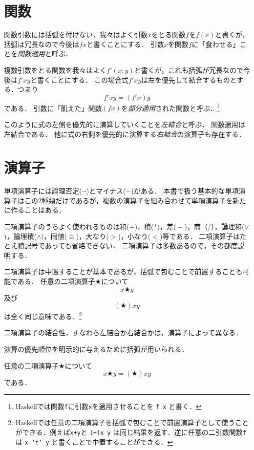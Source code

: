 \documentclass[twocolumn]{jsbook}
\newcommand{\keyword}[1]{\emph{#1}}
\newcommand{\code}[1]{\texttt{#1}}
\newenvironment{point}{\begin{screen}}{\end{screen}}
\newcommand{\binaryeq}{\equiv}
\newcommand{\binaryl}{<}
\newcommand{\binaryg}{>}
\newcommand{\binaryadd}{+}
\newcommand{\binarysub}{-}
\newcommand{\binarymultiply}{*}
\newcommand{\binarydivide}{/}
\newcommand{\binaryor}{\vee}
\newcommand{\binaryand}{\wedge}
\newcommand{\mathbinaryop}{\bigstar}
\begin{document}
\section{関数}

関数引数には括弧を付けない．我々はよく引数$x$をとる関数$f$を$f(x)$と書くが，括弧は冗長なので今後は$fx$と書くことにする．
引数$x$を関数$f$に「食わせる」ことを\keyword{関数適用}と呼ぶ．

複数引数をとる関数を我々はよく$f'(x,y)$と書くが，これも括弧が冗長なので今後は$f'xy$と書くことにする．
この場合式$f'xy$は左を優先して結合するものとする．つまり$$f'xy=(f'x)y$$である．
引数に「飢えた」関数$(fx)$を\keyword{部分適用}された関数と呼ぶ．\footnote{Haskellでは関数\code{f}に引数\code{x}を適用させることを \code{f x} と書く．}

このように式の左側を優先的に演算していくことを\keyword{左結合}と呼ぶ．
関数適用は左結合である．
他に式の右側を優先的に演算する\keyword{右結合}の演算子も存在する．

\section{演算子}

単項演算子には論理否定($\neg$)とマイナス($-$)がある．
本書で扱う基本的な単項演算子はこの2種類だけであるが，複数の演算子を組み合わせて単項演算子を新たに作ることはある．

二項演算子のうちよく使われるものは和($\binaryadd$)，積($\binarymultiply$)，差(${}\binarysub{}$)，商（${}\binarydivide{}$），論理和($\binaryor$)，論理積($\binaryand$)，同値($\binaryeq$)，大なり($\binaryg$)，小なり($\binaryl$)等である．
二項演算子はたとえ積記号であっても省略できない．
二項演算子は多数あるので，その都度説明する．

二項演算子は中置することが基本であるが，括弧で包むことで前置することも可能である．
任意の二項演算子$\mathbinaryop$について$$x\mathbinaryop y$$及び$$(\mathbinaryop)xy$$は全く同じ意味である．\footnote{Haskellでは任意の二項演算子を括弧で包むことで前置演算子として使うことができる．例えば\code{x+y}と \code{(+)x y} は同じ結果を返す．逆に任意の二引数関数\code{f}は \code{x `f` y} と書くことで中置することができる．}

二項演算子の結合性，すなわち左結合か右結合かは，演算子によって異なる．

演算の優先順位を明示的に与えるために括弧が用いられる．

\begin{point}
任意の二項演算子$\mathbinaryop$について$$x\mathbinaryop y=(\mathbinaryop)xy$$である．
\end{point}
\end{document}
